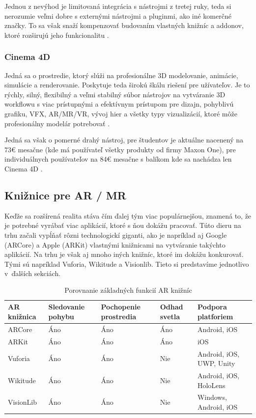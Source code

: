 Jednou z nevýhod je limitovaná integrácia s nástrojmi z tretej ruky, teda si nerozumie veľmi dobre s externými nástrojmi a pluginmi, ako iné komerčné značky. To sa však snaží kompenzovať budovaním vlastných knižníc a addonov, ktoré rozširujú jeho funkcionalitu \cite{hill2023blender}. 

\subsubsection{Cinema 4D}

Jedná sa o prostredie, ktorý slúži na profesionálne 3D modelovanie, animácie, simulácie a renderovanie. Poskytuje teda širokú škálu riešení pre užívateľov. Je to rýchly, silný, flexibilný a veľmi stabilný súbor nástrojov na vytváranie 3D workflowu s viac prístupnými a efektívnym prístupom pre dizajn, pohyblivú grafiku, VFX, AR/MR/VR, vývoj hier a všetky typy vizualizácií, ktoré môže profesionálny modelár potrebovať \cite{maxon2024cinema4d}. 

Jedná sa však o pomerné drahý nástroj, pre študentov je aktuálne nacenený na 73€ mesačne (kde má používateľ všetky produkty od firmy Maxon One), pre individuálnych používateľov na 84€ mesačne s balíkom kde sa nachádza len Cinema 4D \cite{maxon2024buy}. 

\subsection{Knižnice pre AR / MR}
Keďže sa rozšírená realita stáva čím ďalej tým viac populárnejšou, znamená to, že je potrebné vyrábať viac aplikácií, ktoré s ňou dokážu pracovať. Túto dieru na trhu začali vypĺňať rôzni technologickí giganti, ako je napríklad aj Google (ARCore) a Apple (ARKit) vlastnými knižnicami na vytváranie takýchto aplikácií. Na trhu je však aj mnoho iných knižníc, ktoré im dokážu konkurovať. Tými sú napríklad Vuforia, Wikitude a Visionlib. Tieto si predstavíme jednotlivo v~ďalších sekciách.

\begin{table}[h]
\centering
\caption{Porovnanie základných funkcií AR knižníc}
\label{tab:ar-features}
\begin{tabularx}{\textwidth}{|l|X|X|X|X|}
\hline
\textbf{AR knižnica} & \textbf{Sledovanie pohybu} & \textbf{Pochopenie prostredia} & \textbf{Odhad svetla} & \textbf{Podpora platforiem} \\ \hline
ARCore & Áno & Áno & Áno & Android, iOS \\ \hline
ARKit & Áno & Áno & Áno & iOS \\ \hline
Vuforia & Áno & Áno & Nie & Android, iOS, UWP, Unity \\ \hline
Wikitude & Áno & Áno & Nie & Android, iOS, HoloLens \\ \hline
VisionLib & Áno & Áno & Nie & Windows, Android, iOS \\ \hline
\end{tabularx}
\end{table}

